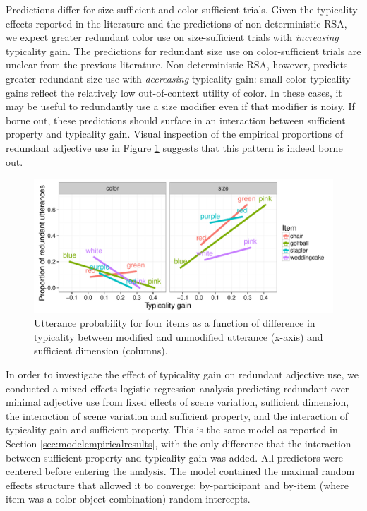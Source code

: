 \documentclass[11pt]{article}
\newcommand{\figref}[1]{Figure \ref{#1}}
\newcommand{\sectionref}[1]{Section \ref{#1}}
\begin{document}
Predictions differ for size-sufficient and color-sufficient trials. Given the typicality effects reported in the literature and the predictions of non-deterministic RSA, we expect greater redundant color use on size-sufficient trials with \emph{increasing} typicality gain. The predictions for redundant size use on color-sufficient trials are unclear from the previous literature. Non-deterministic RSA, however,  predicts greater redundant size use with \emph{decreasing} typicality gain: small color typicality gains reflect the relatively low out-of-context utility of color. In these cases, it may be useful to redundantly use a size modifier even if that modifier is noisy. If borne out, these predictions should surface in an interaction between sufficient property and typicality gain. Visual inspection of the empirical proportions of redundant adjective use in \figref{fig:maxtypicalitydiff} suggests that this pattern is indeed borne out.

\begin{figure}
\centering
\includegraphics[width=.9\textwidth]{pics/maxtypicalitydiff}
\caption{Utterance probability for four items as a function of difference in typicality between modified and unmodified utterance (x-axis) and sufficient dimension (columns). }
\label{fig:maxtypicalitydiff}
\end{figure}

In order to investigate the effect of typicality gain on redundant adjective use, we conducted a mixed effects logistic regression analysis predicting redundant over minimal adjective use from fixed effects of scene variation, sufficient dimension, the interaction of scene variation and sufficient property, and the interaction of typicality gain and sufficient property. This is the same model as reported in \sectionref{sec:modelempiricalresults}, with the only difference that the interaction between sufficient property and typicality gain was added. All predictors were centered before entering the analysis. The model contained the maximal random effects structure that allowed it to converge: by-participant and by-item (where item was a color-object combination) random intercepts. 
\end{document}
